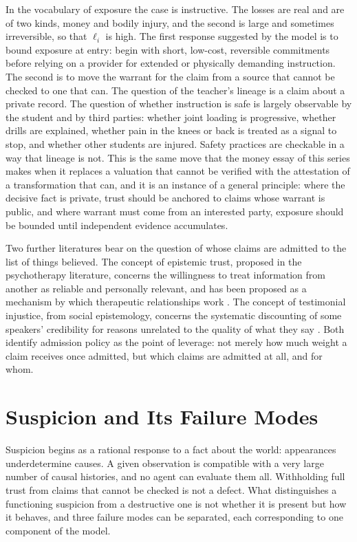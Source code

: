 \documentclass[11pt]{article}
\theoremstyle{definition}
\begin{document}
In the vocabulary of exposure the case is instructive. The losses are real and are of two kinds, money and bodily injury, and the second is large and sometimes irreversible, so that $\ell_i$ is high. The first response suggested by the model is to bound exposure at entry: begin with short, low-cost, reversible commitments before relying on a provider for extended or physically demanding instruction. The second is to move the warrant for the claim from a source that cannot be checked to one that can. The question of the teacher's lineage is a claim about a private record. The question of whether instruction is safe is largely observable by the student and by third parties: whether joint loading is progressive, whether drills are explained, whether pain in the knees or back is treated as a signal to stop, and whether other students are injured. Safety practices are checkable in a way that lineage is not. This is the same move that the money essay of this series makes when it replaces a valuation that cannot be verified with the attestation of a transformation that can, and it is an instance of a general principle: where the decisive fact is private, trust should be anchored to claims whose warrant is public, and where warrant must come from an interested party, exposure should be bounded until independent evidence accumulates.

Two further literatures bear on the question of whose claims are admitted to the list of things believed. The concept of epistemic trust, proposed in the psychotherapy literature, concerns the willingness to treat information from another as reliable and personally relevant, and has been proposed as a mechanism by which therapeutic relationships work \cite{fonagy2014}. The concept of testimonial injustice, from social epistemology, concerns the systematic discounting of some speakers' credibility for reasons unrelated to the quality of what they say \cite{fricker2007}. Both identify admission policy as the point of leverage: not merely how much weight a claim receives once admitted, but which claims are admitted at all, and for whom.

\section{Suspicion and Its Failure Modes}
\label{sec:paranoia}

Suspicion begins as a rational response to a fact about the world: appearances underdetermine causes. A given observation is compatible with a very large number of causal histories, and no agent can evaluate them all. Withholding full trust from claims that cannot be checked is not a defect. What distinguishes a functioning suspicion from a destructive one is not whether it is present but how it behaves, and three failure modes can be separated, each corresponding to one component of the model.
\end{document}
